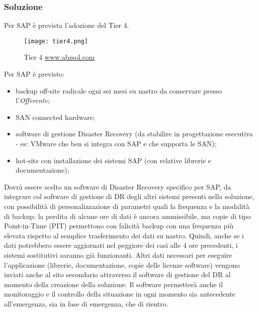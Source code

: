 \subsubsection{Soluzione}
Per SAP è prevista l'adozione del Tier 4.
\begin{figure}[H]
\centering
\texttt{[image: tier4.png]}
\caption{Tier 4 \href{https://www.abzsol.com/cms/images/stories/pdf/business_continuity.pdf}{www.abzsol.com}}\end{figure}
Per SAP è previsto:
\begin{itemize}
\item backup off-site radicale ogni sei mesi su nastro  da conservare presso l'\textit{Offerente};
\item SAN connected hardware;
\item software di gestione Disaster Recovery (da stabilire in progettazione esecutiva - es: VMware che ben si integra con SAP e che supporta le SAN);
\item hot-site con installazione dei sistemi SAP (con relative librerie e documentazione);
\end{itemize}
Dovrà essere scelto un software di Disaster Recovery specifico per SAP, da integrare col software di gestione di DR degli altri sistemi presenti nella soluzione, con possibilità di personalizzazione di parametri quali la frequenza e la modalità di backup: la perdita di alcune ore di dati è ancora ammissibile, ma copie di tipo Point-in-Time (PIT) permettono con falicità backup con una frequenza più elevata rispetto al semplice trasferimento dei dati su nastro.
Quindi, anche se i dati potrebbero essere aggiornati nel peggiore dei casi alle 4 ore precedenti, i sistemi sostitutivi saranno già funzionanti.
Altri dati necessari per eseguire l'applicazione (librerie, documentazione, copie delle licenze software) vengono inviati anche al sito secondario attraverso il software di gestione del DR al momento della creazione della soluzione. Il software permetterà anche il monitoraggio e il controllo della situazione in ogni momento sia antecedente all'emergenza, sia in fase di emergenza, che di rientro.

